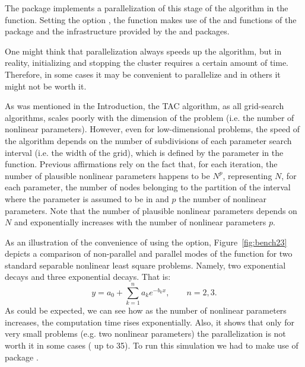 The  package implements a parallelization of this stage of the algorithm in the  function. Setting the option , the function makes use of the  and  functions of the  \citep{package_foreach} package and the infrastructure provided by the  \citep{R} and  packages.

One might think that parallelization always speeds up the algorithm, but in reality, initializing and stopping the cluster requires a certain amount of time. Therefore, in some cases it may be convenient to parallelize and in others it might not be worth it. 

As was mentioned in the Introduction, the TAC algorithm, as all grid-search algorithms, scales poorly with the dimension of the problem (i.e. the number of nonlinear parameters). However, even for low-dimensional problems, the speed of the algorithm depends on the number of subdivisions of each parameter search interval (i.e. the width of the grid), which is defined by the parameter  in the  function. Previous affirmations rely on the fact that, for each iteration, the number of plausible nonlinear parameters happens to be $N^p$, representing $N$, for each parameter, the number of nodes belonging to the partition of the interval where the parameter is assumed to be in and $p$ the number of nonlinear parameters. Note that the number of plausible nonlinear parameters depends on $N$ and exponentially increases with the number of nonlinear parameters $p$.


As an illustration of the convenience of using the  option, Figure~\ref{fig:bench23} depicts a comparison of non-parallel and parallel modes of the  function for two standard separable nonlinear least square problems. Namely, two exponential decays and three exponential decays. That is: 
\begin{equation*}
y = a_0 + \sum_{k=1}^n a_k e^{-b_k x},\qquad n = 2,3.
\end{equation*}
As could be expected, we can see how  as the number of nonlinear parameters increases, the computation time rises exponentially. Also, it shows that only for very small problems (e.g. two nonlinear parameters) the parallelization is not worth it in some cases ( up to 35). To run this simulation we had to make use of  package \citep{package_dplyr}.

